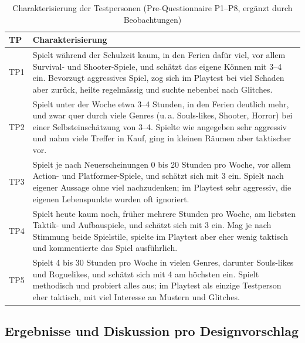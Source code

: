 \documentclass[../Main.tex]{subfiles}
\begin{document}
\begin{table}[H]
    \centering
    \small
    \renewcommand{\arraystretch}{1.3}
    \begin{tabular}{|>{\raggedright\arraybackslash}p{1.2cm}|>{\raggedright\arraybackslash}p{12.6cm}|}
        \hline
        \textbf{TP} & \textbf{Charakterisierung} \\
        \hline
        TP1 & Spielt während der Schulzeit kaum, in den Ferien dafür viel, vor allem Survival- und Shooter-Spiele, und schätzt das eigene Können mit 3--4 ein. Bevorzugt aggressives Spiel, zog sich im Playtest bei viel Schaden aber zurück, heilte regelmässig und suchte nebenbei nach Glitches. \\
        \hline
        TP2 & Spielt unter der Woche etwa 3--4 Stunden, in den Ferien deutlich mehr, und zwar quer durch viele Genres (u.\,a. Souls-likes, Shooter, Horror) bei einer Selbsteinschätzung von 3--4. Spielte wie angegeben sehr aggressiv und nahm viele Treffer in Kauf, ging in kleinen Räumen aber taktischer vor. \\
        \hline
        TP3 & Spielt je nach Neuerscheinungen 0 bis 20 Stunden pro Woche, vor allem Action- und Platformer-Spiele, und schätzt sich mit 3 ein. Spielt nach eigener Aussage ohne viel nachzudenken; im Playtest sehr aggressiv, die eigenen Lebenspunkte wurden oft ignoriert. \\
        \hline
        TP4 & Spielt heute kaum noch, früher mehrere Stunden pro Woche, am liebsten Taktik- und Aufbauspiele, und schätzt sich mit 3 ein. Mag je nach Stimmung beide Spielstile, spielte im Playtest aber eher wenig taktisch und kommentierte das Spiel ausführlich. \\
        \hline
        TP5 & Spielt 4 bis 30 Stunden pro Woche in vielen Genres, darunter Souls-likes und Roguelikes, und schätzt sich mit 4 am höchsten ein. Spielt methodisch und probiert alles aus; im Playtest als einzige Testperson eher taktisch, mit viel Interesse an Mustern und Glitches. \\
        \hline
    \end{tabular}
    \caption{Charakterisierung der Testpersonen (Pre-Questionnaire P1--P8, ergänzt durch Beobachtungen)}
    \label{tab:Testpersonen}
\end{table}

\subsection{Ergebnisse und Diskussion pro Designvorschlag} \label{sec:ErgVorschlag} \label{sec:Interpretation}
\end{document}
